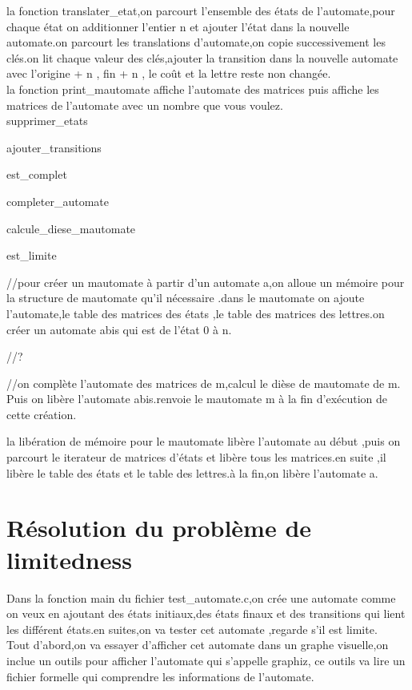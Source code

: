 \documentclass{report}
\begin{document}
la fonction translater\_etat,on parcourt l'ensemble des états de l'automate,pour chaque  état on additionner l'entier n et ajouter l’état dans la nouvelle automate.on parcourt les translations d'automate,on copie successivement les clés.on lit chaque valeur des clés,ajouter la transition dans la nouvelle automate avec l'origine + n , fin + n , le coût et la lettre reste non changée.\\

la fonction print\_mautomate affiche l'automate des matrices puis affiche les matrices de l'automate avec un nombre que vous voulez.\\


supprimer\_etats 

ajouter\_transitions

est\_complet

completer\_automate

calcule\_diese\_mautomate

est\_limite


//pour créer un mautomate à partir d'un automate a,on alloue un mémoire pour la structure de mautomate qu'il nécessaire .dans le mautomate on ajoute l'automate,le table des matrices des états ,le table des matrices des lettres.on créer un automate abis qui est de l'état 0 à n.

//?

//on complète l'automate des matrices de m,calcul le dièse de mautomate de m. Puis on libère l'automate abis.renvoie le mautomate m à la fin d'exécution de cette création.


la libération de mémoire pour le mautomate libère l'automate au début ,puis on parcourt le iterateur de matrices d'états et libère tous les matrices.en suite ,il libère le table des états et le table des lettres.à la fin,on libère l'automate a.\\



\chapter{Résolution du problème de limitedness}

Dans la fonction main du fichier test\_automate.c,on crée une automate comme on veux en ajoutant des états initiaux,des états finaux et des transitions qui lient les différent états.en suites,on va tester cet automate ,regarde s'il est limite.\\

Tout d'abord,on va essayer d'afficher cet automate dans un graphe visuelle,on inclue un outils pour afficher l'automate qui s'appelle  graphiz, ce outils va lire un fichier formelle qui comprendre les informations de l'automate.\\
\end{document}
